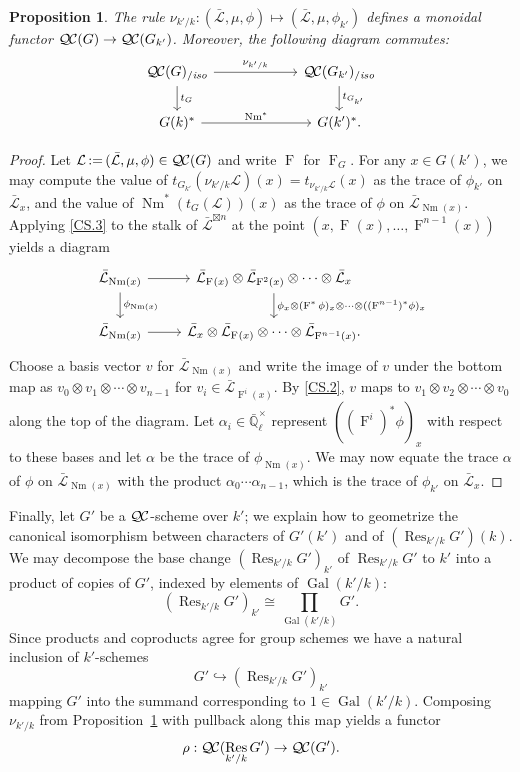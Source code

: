 \documentclass[11pt]{amsart}
\theoremstyle{plain}
\newtheorem{proposition}[theorem]{Proposition}
\theoremstyle{definition}
\theoremstyle{remark}
\newcommand{\EE}{\mathbb{\bar Q}_\ell}
\newcommand{\EEx}{\EE^\times}
\DeclareMathOperator{\Gal}{Gal}
\newcommand{\Frob}[1]{\operatorname{F}_{#1}}
\DeclareMathOperator{\Res}{Res}
\DeclareMathOperator{\Nm}{Nm}
\newcommand{\ceq}{{\, :=\, }}
\newcommand{\qcs}[1]{{\mathcal{#1}}}
\newcommand{\gqcs}[1]{{\mathcal{\bar #1}}}
\newcommand{\QC}{{\mathcal{Q\hskip-0.8pt C}}}
\newcommand{\QCiso}[1]{\QC(#1)_{/\textit{iso}}}
\newcommand{\trFrob}[1]{t_{#1}}
\begin{document}
\begin{proposition}\label{prop:basechange}
 The rule $\nu_{k'/k}: (\gqcs{L}, \mu, \phi) \mapsto (\gqcs{L}, \mu, \phi_{k'})$ 
 defines a monoidal functor $\QC(G) \to \QC(G_{k'})$. 
 Moreover, the following diagram commutes:
\[
\begin{tikzcd}[column sep=60]
\QCiso{G} \rar{\nu_{k'/k}} \dar{\trFrob{G}} & \QCiso{G_{k'}} \dar{\trFrob{G_{k'}}} \\
G(k)^*  \rar{\Nm^*} & G(k')^*.
\end{tikzcd}
\]
\end{proposition}
\begin{proof}
Let $\qcs{L} \ceq (\gqcs{L}, \mu, \phi) \in \QC(G)$ and write $\Frob{}$ for $\Frob{G}$.  For any $x \in G(k')$,
we may compute the value of $t_{G_{k'}}(\nu_{k'/k}\qcs{L})(x)= t_{\nu_{k'/k}\qcs{L}}(x)$ as the trace of $\phi_{k'}$ on $\gqcs{L}_x$,
and the value of $\Nm^*(t_G(\qcs{L}))(x)$ as the trace of $\phi$ on $\gqcs{L}_{\Nm(x)}$.
Applying \ref{CS.3} to the stalk of $\gqcs{L}^{\boxtimes n}$ at the point $(x, \Frob{}(x), \ldots, \Frob{}^{n-1}(x))$ yields a diagram
\[
\begin{tikzcd}
\gqcs{L}_{\Nm(x)} \rar \dar{\phi_{\Nm(x)}} & \gqcs{L}_{\Frob{}(x)} \otimes \gqcs{L}_{\Frob{}^2(x)} \otimes \cdots \otimes \gqcs{L}_x
\dar{\phi_x \otimes (\Frob{}^*\phi)_x \otimes \cdots \otimes ((\Frob{}^{n-1})^*\phi)_x} \\
\gqcs{L}_{\Nm(x)} \rar & \gqcs{L}_x \otimes \gqcs{L}_{\Frob{}(x)} \otimes \cdots \otimes \gqcs{L}_{\Frob{}^{n-1}(x)}.
\end{tikzcd}
\]
Choose a basis vector $v$ for $\gqcs{L}_{\Nm(x)}$ and write the image of $v$ under the
bottom map as $v_0 \otimes v_1 \otimes \cdots \otimes v_{n-1}$
for $v_i \in \gqcs{L}_{\Frob{}^i(x)}$.  By \ref{CS.2}, $v$ maps to
$v_1 \otimes v_2 \otimes \cdots \otimes v_0$ along the top of the diagram.
Let $\alpha_i \in \EEx$ represent $((\Frob{}^i)^*\phi)_x$ with respect to these bases and let $\alpha$ be
the trace of $\phi_{\Nm(x)}$.  We may now equate the trace $\alpha$ of $\phi$ on $\gqcs{L}_{\Nm(x)}$
with the product $\alpha_0 \cdots \alpha_{n-1}$, which is the trace of $\phi_{k'}$ on $\gqcs{L}_x$.
\end{proof}

Finally, let $G'$ be a $\QC$-scheme over $k'$;
we explain how to geometrize the canonical isomorphism between characters of $G'(k')$ and of $(\Res_{k'/k}G')(k)$.
We may decompose the base change $(\Res_{k'/k}G')_{k'}$ of $\Res_{k'/k}G'$ to $k'$
into a product of copies of $G'$, indexed by elements of $\Gal(k'/k)$:
\[
(\Res_{k'/k}G')_{k'} \cong \prod_{\Gal(k'/k)} G'.
\]
Since products and coproducts agree for group schemes we have a natural inclusion of $k'$-schemes 
\[
G' \hookrightarrow (\Res_{k'/k}G')_{k'}
\]
mapping $G'$ into the summand corresponding to $1 \in \Gal(k'/k)$.  Composing $\nu_{k'/k}$ 
from Proposition~\ref{prop:basechange} with pullback along this map yields a functor
\[
\rho : \QC(\Res_{k'/k}G') \to \QC(G').
\]
\end{document}
